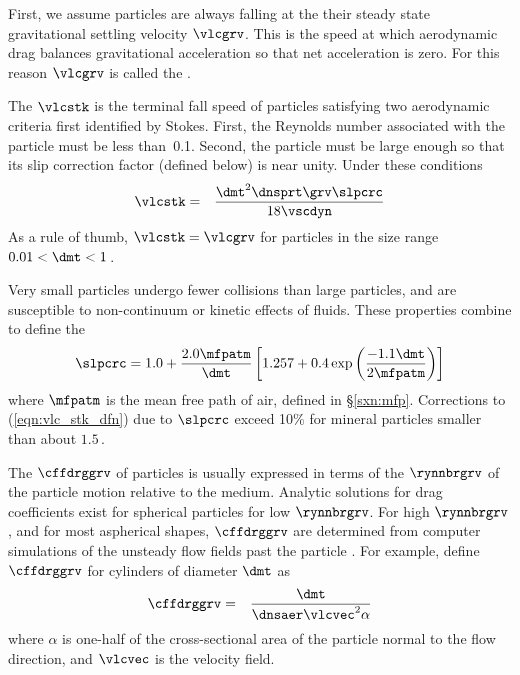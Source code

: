 \documentclass[12pt,twoside]{book}
\begin{document}
First, we assume particles are always falling at the their steady
state gravitational settling velocity $\vlcgrv$.
This is the speed at which aerodynamic drag balances gravitational
acceleration so that net acceleration is zero.
For this reason $\vlcgrv$ is called the .

The  $\vlcstk$ is the
terminal fall speed of particles satisfying two aerodynamic criteria
first identified by Stokes. 
First, the Reynolds number associated with the particle must be less
than~0.1.
Second, the particle must be large enough so that its slip correction
factor (defined below) is near unity.
Under these conditions 
\begin{eqnarray}
\vlcstk & = & \frac{\dmt^{2} \dnsprt \grv \slpcrc}{18 \vscdyn}
\label{eqn:vlc_stk_dfn}
\end{eqnarray}
As a rule of thumb, $\vlcstk = \vlcgrv$ for particles in the size range  
$0.01 < \dmt < 1$\,\um.

Very small particles undergo fewer collisions than large particles,
and are susceptible to non-continuum or kinetic effects of fluids.
These properties combine to define the  
\begin{equation}
\slpcrc = 1.0 + \frac{2.0 \mfpatm}{\dmt}
\left[ 1.257 + 0.4 
\exp \left( \frac{-1.1 \dmt}{2 \mfpatm} \right) 
\right]
\label{eqn:slp_crc_dfn}
\end{equation}
where $\mfpatm$ is the mean free path of air, defined in
\S\ref{sxn:mfp}. 
Corrections to (\ref{eqn:vlc_stk_dfn}) due to $\slpcrc$ exceed 10\%
for mineral particles smaller than about $1.5$\,\um.  

The  $\cffdrggrv$ of particles is usually
expressed in terms of the  $\rynnbrgrv$ of the 
particle motion relative to the medium.
Analytic solutions for drag coefficients exist for spherical particles 
for low $\rynnbrgrv$.
For high $\rynnbrgrv$, and for most aspherical shapes, $\cffdrggrv$
are determined from computer simulations of the unsteady flow fields
past the particle \cite[]{Wan02}.
For example, \cite{Wan02} define $\cffdrggrv$ for cylinders of
diameter $\dmt$ as 
\begin{eqnarray}
\cffdrggrv & = & \frac{\dmt}{\dnsaer \vlcvec^{2} \alpha}
\label{eqn:cff_drg_dfn}
\end{eqnarray}
where $\alpha$ is one-half of the cross-sectional area of the particle
normal to the flow direction, and $\vlcvec$ is the velocity field.
\end{document}
